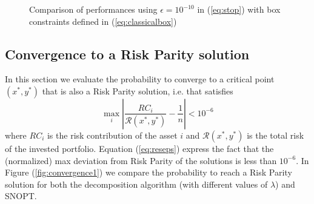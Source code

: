 \begin{figure}
{{
}
}
\caption{Comparison of performances using $\epsilon = 10^{-10}$ in (\ref{eq:stop}) with box constraints defined in (\ref{eq:classicalbox})}
\end{figure}

\subsection{Convergence to a Risk Parity solution}
In this section we evaluate the probability to converge to a critical point $(x^*,y^*)$ that is also a Risk Parity solution, i.e. that satisfies 
\begin{equation}\label{eq:reseps}
\max_i \left| \frac{RC_i}{\mathcal{R}(x^*,y^*)} - \frac{1}{n} \right| < 10^{-6}
\end{equation}
where $RC_i$ is the risk contribution of the asset $i$ and ${\mathcal{R}(x^*,y^*)}$ is the total risk of the invested portfolio. Equation (\ref{eq:reseps}) express the fact that the (normalized) max deviation from Risk Parity of the solutions is less than $10^{-6}$. In Figure (\ref{fig:convergence1}) we compare the probability to reach a Risk Parity solution for both the decomposition algorithm (with different values of $\lambda$) and SNOPT. 

